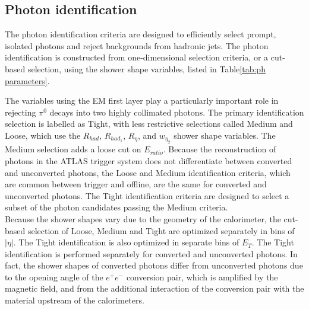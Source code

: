 \documentclass[a4paper, oneside, 11pt, openright]{book}
\begin{document}
			\subsection{Photon identification}
			The photon identification criteria \cite{El ph reco} are designed to efficiently select prompt, isolated photons and reject backgrounds from hadronic jets. The photon identification is constructed from one-dimensional selection criteria, or a cut-based selection, using the shower shape variables, listed in Table\ref{tab:ph parameters}.
			
			The variables using the EM first layer play a particularly important role in rejecting $\pi^0$ decays into
			two highly collimated photons. The primary identification selection is labelled as Tight, with less restrictive selections called
			Medium and Loose, which use the $R_{had}$, $R_{had_1}$, $R_{\eta}$, and $w_{\eta_2}$ shower shape variables. The Medium selection adds a loose cut on $E_{ratio}$. Because the reconstruction of photons in the ATLAS trigger system does not differentiate between converted and unconverted photons, the Loose and Medium identification criteria, which are common between trigger and offline, are the same for converted and unconverted photons. The Tight identification criteria are designed to select a subset of the photon candidates passing the Medium criteria.\\
			Because the shower shapes vary due to the geometry of the calorimeter, the cut-based selection of Loose, Medium and Tight
			are optimized separately in bins of $|\eta|$. The Tight identification is also optimized in separate bins of $E_T$. The Tight identification is performed separately for converted and
			unconverted photons. In fact, the shower shapes of converted photons differ from unconverted photons due to the opening angle of the $e^{+}e^{-}$ conversion pair, which is amplified by the magnetic field, and from the additional interaction of the conversion pair with the material upstream of the calorimeters.
			
\end{document}

